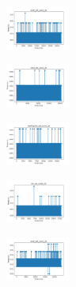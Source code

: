 \begin{figure}[H]
\begin{subfigure}
    \end{subfigure}
    \hfill
    \begin{subfigure}
        \centering
        \includegraphics[width=0.234\textwidth]{img/hs/ecoli_set_const_20_589741062_time.png}
    \end{subfigure}
    \hfill
    \begin{subfigure}
        \centering
        \includegraphics[width=0.234\textwidth]{img/hs/rand_set_const_20_589741062_time.png}
    \end{subfigure}
    \hfill
    \begin{subfigure}
        \centering
        \includegraphics[width=0.234\textwidth]{img/hs/newthyroid_set_const_20_589741062_time.png}
    \end{subfigure}
    \hfill
    \begin{subfigure}
        \centering
        \includegraphics[width=0.234\textwidth]{img/hs/iris_set_const_20_277451237_time.png}
    \end{subfigure}
    \hfill
    \begin{subfigure}
        \centering
        \includegraphics[width=0.234\textwidth]{img/hs/ecoli_set_const_20_277451237_time.png}
    \end{subfigure}
    \hfill
    \begin{subfigure}

\end{subfigure}
\end{figure}
